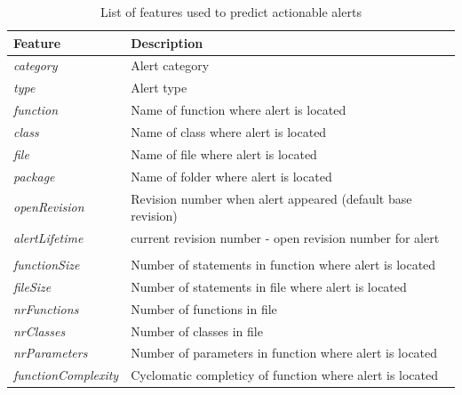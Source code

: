 
\begin{longtable}[c]{@{}ll@{}}
	\caption{List of features used to predict actionable alerts}
	\label{act:featuresList}\\
	\toprule
	\textbf{Feature}            & \textbf{Description}                                               \\* \midrule
	\endfirsthead
	\endhead
	\bottomrule
	\endfoot
	\endlastfoot
	\textit{category}           & Alert category                                                     \\
	\textit{type}               & Alert type                                                         \\
	\textit{function}           & Name of function where alert is located                            \\
	\textit{class}              & Name of class where alert is located                               \\
	\textit{file}               & Name of file where alert is located                                \\
	\textit{package}            & Name of folder where alert is located                              \\
	\textit{openRevision}       & Revision number when alert appeared (default base revision)        \\
	\textit{alertLifetime}      & current revision number - open revision number for alert           \\
	\textit{}                   &                                                                    \\
	\textit{functionSize}       & Number of statements in function where alert is located            \\
	\textit{fileSize}           & Number of statements in file where alert is located                \\
	\textit{nrFunctions}        & Number of functions in file                                        \\
	\textit{nrClasses}          & Number of classes in file                                          \\
	\textit{nrParameters}       & Number of parameters in function where alert is located            \\
	\textit{functionComplexity} & Cyclomatic completicy of function where alert is located           \\

\end{longtable}

